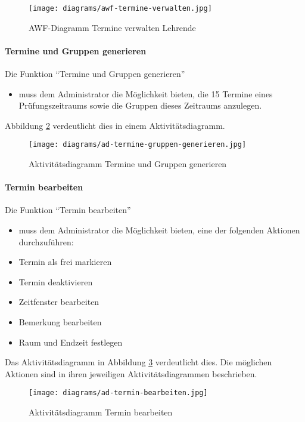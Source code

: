 \begin{figure}
  \centering
  \texttt{[image: diagrams/awf-termine-verwalten.jpg]}
  \caption{AWF-Diagramm Termine verwalten Lehrende}
  \label{fig:awf-termine-verwalten}
\end{figure}

\paragraph{Termine und Gruppen generieren}

Die Funktion ``Termine und Gruppen generieren''
\begin{itemize}
  \item muss dem Administrator die Möglichkeit bieten, die 15 Termine eines Prüfungszeitraums sowie die Gruppen dieses Zeitraums anzulegen.
\end{itemize}

Abbildung \ref{fig:ad-termine-gruppen-generieren} verdeutlicht dies in einem Aktivitätsdiagramm.

\begin{figure}
  \centering
  \texttt{[image: diagrams/ad-termine-gruppen-generieren.jpg]}
  \caption{Aktivitätsdiagramm Termine und Gruppen generieren}
  \label{fig:ad-termine-gruppen-generieren}
\end{figure}

\paragraph{Termin bearbeiten}

Die Funktion ``Termin bearbeiten''
\begin{itemize}
  \item muss dem Administrator die Möglichkeit bieten, eine der folgenden Aktionen durchzuführen:
  \item Termin als frei markieren
  \item Termin deaktivieren
  \item Zeitfenster bearbeiten
  \item Bemerkung bearbeiten
  \item Raum und Endzeit festlegen
\end{itemize}

Das Aktivitätsdiagramm in Abbildung \ref{fig:ad-termin-bearbeiten} verdeutlicht dies. Die möglichen Aktionen
sind in ihren jeweiligen Aktivitätsdiagrammen beschrieben.

\begin{figure}
  \centering
  \texttt{[image: diagrams/ad-termin-bearbeiten.jpg]}
  \caption{Aktivitätsdiagramm Termin bearbeiten}
  \label{fig:ad-termin-bearbeiten}
\end{figure}

